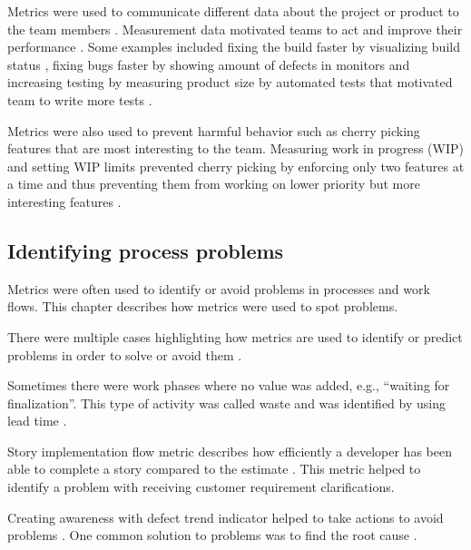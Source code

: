 \documentclass{sig-alternate}
\newcommand{\eetu}[1]{\ignorespaces}
\newcommand{\juha}[1]{\ignorespaces}
\begin{document}
Metrics were used to communicate different data about the project or product
to the team members
\cite{Trapa2006243,Talby200940,Polk2011263,Staron20101069,Talby2006100}.
Measurement data motivated teams to act and improve their
performance
\cite{Talby200940,Polk2011263,Cheng200929,LNBIP01490121,Jakobsen2011168}.
Some examples included fixing the build faster by visualizing build status
\cite{Jakobsen2011168,LNBIP01490121}, fixing bugs faster by showing amount of
defects in monitors \cite{Cheng200929} and increasing testing by measuring
product size by automated tests that motivated team to write more tests
\cite{Talby200940}.

Metrics were also used to prevent harmful behavior such as cherry picking
features that are most interesting to the team. Measuring
work in progress (WIP) and setting WIP limits prevented cherry picking by
enforcing only two features at a time and thus preventing them from working on
lower priority but more interesting features \cite{Middleton2007387}.

\subsection{Identifying process problems}
\label{sec:ProblemIdentification}
Metrics were often used to identify or avoid problems in processes and work
flows. This chapter describes how metrics were used to spot problems.

There were multiple cases highlighting how metrics are used to identify or
predict problems in order to solve or avoid them
\cite{Petersen2011975,Trapa2006243,Mahnic201273,Petersen2010654,Shen200725,Mujtaba2010139,Tudor2006367}.

Sometimes there were work phases where no value was added, e.g.,
``waiting for finalization''. This type of activity was called waste and was
identified by using lead time \cite{Petersen2012108}.

Story implementation flow metric describes how efficiently a developer has
been able to complete a story compared to the estimate \cite{Jakobsen2011168}.
This metric helped to identify a problem with receiving customer requirement clarifications.

Creating awareness with defect trend indicator helped to take actions to avoid
problems \cite{Staron20101069}. One common solution to problems was to find
the root cause \cite{Jakobsen2011168,Middleton2007387}.
\end{document}
